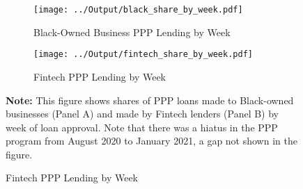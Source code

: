 \documentclass[11pt]{article}
\begin{document}
\newpage
\begin{figure}[H]
	\caption{\textbf{Black-Owned Businesses PPP Lending by Week}} \label{f:loans_week}
	\centering
	\begin{subfigure}{\linewidth}
		\caption{Black-Owned Business PPP Lending by Week}
		\centering
		\texttt{[image: ../Output/black\_share\_by\_week.pdf]}
		\vspace{0.5cm}
	\end{subfigure}

	\begin{subfigure}{\linewidth}
		\caption{Fintech PPP Lending by Week}
		\centering
		\texttt{[image: ../Output/fintech\_share\_by\_week.pdf]}
	\end{subfigure}

	\begin{minipage}{\textwidth} \medskip
		\footnotesize{{\bf Note: }This figure shows shares of PPP loans made to Black-owned businesses (Panel A) and made by Fintech lenders (Panel B) by week of loan approval. Note that there was a hiatus in the PPP program from August 2020 to January 2021, a gap not shown in the figure.}
	\end{minipage}
\end{figure}
\end{document}

